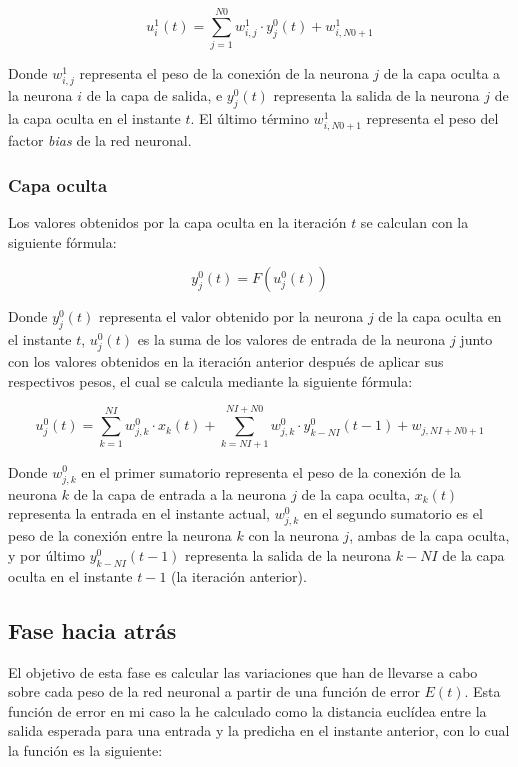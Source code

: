 \documentclass[a4paper,11pt]{article}
\begin{document}
\begin{equation}
	\label{salida_u}
	u_{i}^{1}(t) = \sum_{j=1}^{N0}{w_{i,j}^{1} \cdot y_{j}^{0}(t)} + w_{i,N0+1}^{1}
\end{equation}

Donde ${w_{i,j}^{1}}$ representa el peso de la conexión de la neurona ${j}$ de la capa oculta a la neurona ${i}$ de la capa de salida, e ${y_{j}^{0}(t)}$ representa la salida de la neurona ${j}$ de la capa oculta en el instante ${t}$. El último término ${w_{i,N0+1}^{1}}$ representa el peso del factor \textit{bias} de la red neuronal.

\subsubsection{Capa oculta}
Los valores obtenidos por la capa oculta en la iteración ${t}$ se calculan con la siguiente fórmula:

\begin{equation}
	y_{j}^{0}(t) = F\left(u_{j}^{0}(t)\right)
\end{equation}

Donde ${y_{j}^{0}(t)}$ representa el valor obtenido por la neurona ${j}$ de la capa oculta en el instante ${t}$, ${u_{j}^{0}(t)}$ es la suma de los valores de entrada de la neurona ${j}$ junto con los valores obtenidos en la iteración anterior después de aplicar sus respectivos pesos, el cual se calcula mediante la siguiente fórmula:

\begin{equation}
	\label{elman_oculta_u}
	u_{j}^{0}(t) = \sum_{k=1}^{NI}{w_{j,k}^{0} \cdot x_{k}(t)} + \sum_{k=NI+1}^{NI+N0}{w_{j,k}^{0} \cdot y_{k-NI}^{0}(t-1)} + w_{j,NI+N0+1}
\end{equation}

Donde ${w_{j,k}^{0}}$ en el primer sumatorio representa el peso de la conexión de la neurona ${k}$ de la capa de entrada a la neurona ${j}$ de la capa oculta, ${x_{k}(t)}$ representa la entrada en el instante actual, ${w_{j,k}^{0}}$ en el segundo sumatorio es el peso de la conexión entre la neurona ${k}$ con la neurona ${j}$, ambas de la capa oculta, y por último ${y_{k-NI}^{0}(t-1)}$ representa la salida de la neurona ${k-NI}$ de la capa oculta en el instante ${t-1}$ (la iteración anterior).

\subsection{Fase hacia atrás}
El objetivo de esta fase es calcular las variaciones que han de llevarse a cabo sobre cada peso de la red neuronal a partir de una función de error ${E(t)}$. Esta función de error en mi caso la he calculado como la distancia euclídea entre la salida esperada para una entrada y la predicha en el instante anterior, con lo cual la función es la siguiente:
\end{document}
